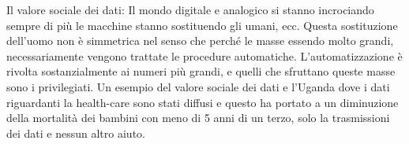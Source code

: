 \documentclass[a4page, 11pt]{article}
\begin{document}
Il valore sociale dei dati: Il mondo digitale e analogico si stanno
incrociando sempre di più le macchine stanno sostituendo gli umani, ecc.
Questa sostituzione dell'uomo non è simmetrica nel senso che perché le
masse essendo molto grandi, necessariamente vengono trattate le
procedure automatiche. L'automatizzazione è rivolta sostanzialmente ai
numeri più grandi, e quelli che sfruttano queste masse sono i
privilegiati. Un esempio del valore sociale dei dati e l'Uganda dove i
dati riguardanti la health-care sono stati diffusi e questo ha portato a
un diminuzione della mortalità dei bambini con meno di 5 anni di un
terzo, solo la trasmissioni dei dati e nessun altro aiuto.
\end{document}
